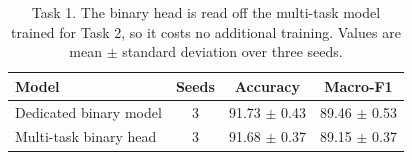 \begin{table}[t]
\caption{Task 1. The binary head is read off the multi-task model trained for Task 2, so it costs no additional training. Values are mean $\pm$ standard deviation over three seeds.}
\label{tab:task1}
\centering
\small
\begin{tabular}{@{}lccc@{}}
\toprule
Model & Seeds & Accuracy & Macro-F1 \\
\midrule
Dedicated binary model & 3 & 91.73 $\pm$ 0.43 & 89.46 $\pm$ 0.53 \\
Multi-task binary head & 3 & 91.68 $\pm$ 0.37 & 89.15 $\pm$ 0.37 \\

\bottomrule
\end{tabular}
\end{table}
